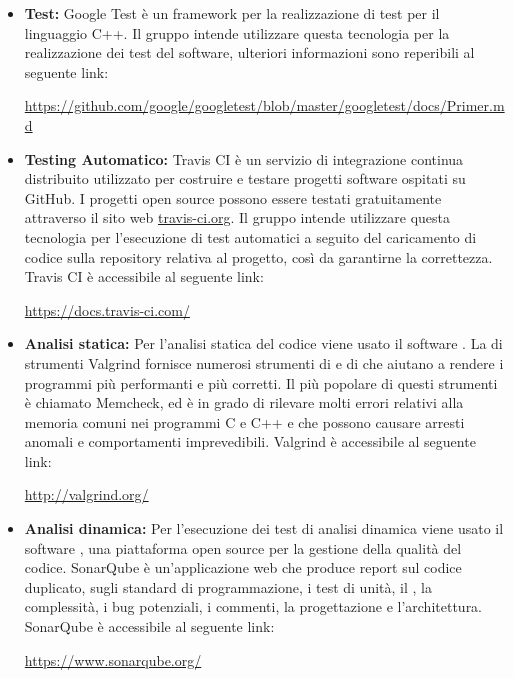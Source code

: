 \documentclass[../NormediProgetto.tex]{subfiles}
\begin{document}
	\begin{itemize}
		\item \textbf{Test:} Google Test è un framework per la realizzazione di test per il linguaggio C++. Il gruppo intende utilizzare questa tecnologia per la realizzazione dei test del software, ulteriori informazioni sono reperibili al seguente link:
		\begin{center}
			\url{https://github.com/google/googletest/blob/master/googletest/docs/Primer.md}
		\end{center}
		\item \textbf{Testing Automatico:} Travis CI è un servizio di integrazione continua distribuito utilizzato per costruire e testare progetti software ospitati su GitHub. I progetti open source possono essere testati gratuitamente attraverso il sito web \url{travis-ci.org}. Il gruppo intende utilizzare questa tecnologia per l'esecuzione di test automatici a seguito del caricamento di codice sulla repository relativa al progetto, così da garantirne la correttezza. Travis CI è accessibile al seguente link:
		\begin{center}
			\url{https://docs.travis-ci.com/}
		\end{center}
		
		\item \textbf{Analisi statica:} Per l’analisi statica del codice viene usato il software . La  di strumenti Valgrind fornisce numerosi strumenti di  e di  che aiutano a rendere i programmi più performanti e più corretti. Il più popolare di questi strumenti è chiamato Memcheck, ed è in grado di rilevare molti errori relativi alla memoria comuni nei programmi C e C++ e che possono causare arresti anomali e comportamenti imprevedibili. Valgrind è accessibile al seguente link: 
		\begin{center}
			\url{http://valgrind.org/}
		\end{center}
		
		\item \textbf{Analisi dinamica:} Per l’esecuzione dei test di analisi dinamica viene usato il software , una piattaforma open source per la gestione della qualità del codice. SonarQube è un’applicazione web che produce report sul codice duplicato, sugli standard di programmazione, i test di unità, il , la complessità, i bug potenziali, i commenti, la progettazione e l’architettura. SonarQube è accessibile al seguente link:
		\begin{center}
			\url{https://www.sonarqube.org/}
		\end{center}
		

\end{itemize}
\end{document}
